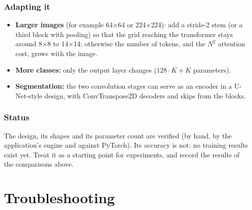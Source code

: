 \documentclass[11pt,a4paper]{article}
\begin{document}
\subsubsection{Adapting it}
\begin{itemize}
  \item \textbf{Larger images} (for example 64$\times$64 or 224$\times$224): add a stride-2 stem (or a third block with pooling) so that
        the grid reaching the transformer stays around 8$\times$8 to 14$\times$14; otherwise the number of tokens, and the $N^2$ attention
        cost, grows with the image.
  \item \textbf{More classes:} only the output layer changes ($128\cdot K + K$ parameters).
  \item \textbf{Segmentation:} the two convolution stages can serve as an encoder in a U-Net-style design, with ConvTranspose2D decoders
        and skips from the blocks.
\end{itemize}

\subsubsection{Status}
The design, its shapes and its parameter count are verified (by hand, by the application's engine and against PyTorch). Its accuracy is
not: no training results exist yet. Treat it as a starting point for experiments, and record the results of the comparisons above.



\section{Troubleshooting}
\end{document}
